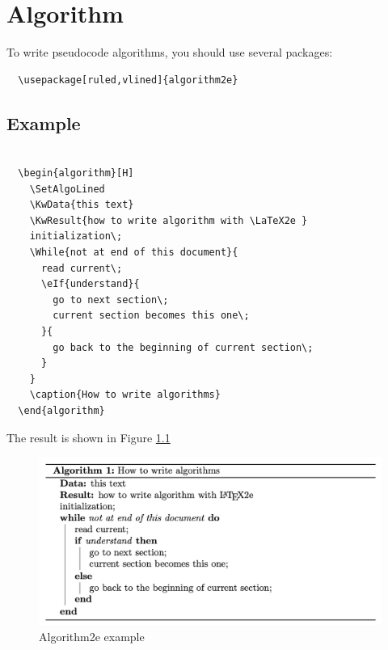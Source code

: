 
\chapter{Algorithm}

To write pseudocode algorithms, you should use several packages:
\lstset{language=TeX}
\begin{lstlisting}
  \usepackage[ruled,vlined]{algorithm2e}
\end{lstlisting}


\section{Example}

\begin{lstlisting}

  \begin{algorithm}[H]
    \SetAlgoLined
    \KwData{this text}
    \KwResult{how to write algorithm with \LaTeX2e }
    initialization\;
    \While{not at end of this document}{
      read current\;
      \eIf{understand}{
        go to next section\;
        current section becomes this one\;
      }{
        go back to the beginning of current section\;
      }
    }
    \caption{How to write algorithms}
  \end{algorithm}

\end{lstlisting}


The result is shown in Figure \ref{fig:algorithm2e-example}
\begin{figure}[H]
  \centering
  \includegraphics[width=\textwidth]{algorithm2e-example}
  \caption{Algorithm2e example}
  \label{fig:algorithm2e-example}
\end{figure}